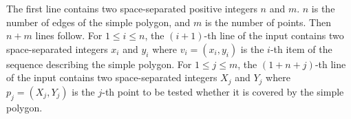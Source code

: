 The first line contains two space-separated positive integers $n$ and $m$.
$n$ is the number of edges of the simple polygon, and 
$m$ is the number of points. Then $n+m$ lines follow.
For $1\le i\le n$, the $(i+1)$-th line of the input contains two 
space-separated integers $x_i$ and $y_i$ where $v_i=(x_i,y_i)$ is the
$i$-th item of the sequence describing the simple polygon.
For $1\le j\le m$, the $(1+n+j)$-th line of the input contains two
space-separated integers $X_j$ and $Y_j$ where $p_j=(X_j,Y_j)$ is the $j$-th
point to be tested whether it is covered by the simple polygon.
